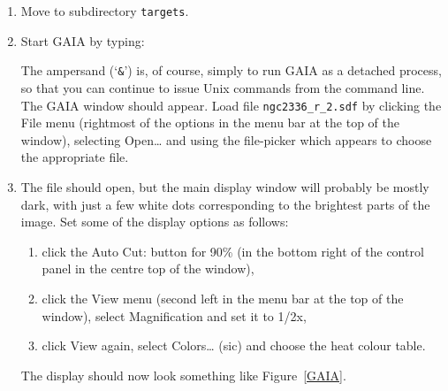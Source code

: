 \documentclass[twoside,11pt]{starlink}
\begin{document}
\begin{enumerate}

  \item Move to subdirectory \texttt{targets}.

  \item Start GAIA by typing:

\begin{terminalv}
\end{terminalv}

   The ampersand (`\texttt{\&}') is, of course, simply to run GAIA as a
   detached process, so that you can continue to issue Unix commands
   from the command line.  The GAIA window should appear.  Load file
   \texttt{ngc2336\_r\_2.sdf} by clicking the \textsf{File} menu (rightmost
   of the options in the menu bar at the top of the window), selecting
   \textsf{Open\ldots} and using the file-picker which appears to choose
   the appropriate file.

  \item The file should open, but the main display window will probably
   be mostly dark, with just a few white dots corresponding to the
   brightest parts of the image.  Set some of the display options as
   follows:

  \begin{enumerate}

    \item click the \textsf{Auto Cut:} button for \textsf{90\%} (in the bottom
     right of the control panel in the centre top of the window),

    \item click the \textsf{View} menu (second left in the menu bar at the
     top of the window), select \textsf{Magnification} and set it to \textsf{1/2x},

    \item click \textsf{View} again, select \textsf{Colors\ldots} (sic) and choose
     the \textsf{heat} colour table.

  \end{enumerate}

   The display should now look something like Figure~\ref{GAIA}.


\end{enumerate}
\end{document}
